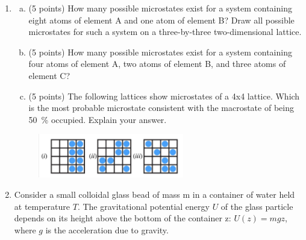 
\DeclareSIUnit{}





\pagebreak

\begin{enumerate}
    \item 
        \begin{enumerate}[a.]
            \item (5 points) How many possible microstates exist for a system containing eight atoms of element
            A and one atom of element B? Draw all possible microstates for such a system on a three-by-three
            two-dimensional lattice.
            \item (5 points) How many possible microstates exist for a system containing four atoms of element A,
            two atoms of element B, and three atoms of element C?
        \item (5 points) The following lattices show microstates of a 4x4 lattice. Which is the most probable
            microstate consistent with the macrostate of being \SI{50}{\percent} occupied. Explain your answer.
        \end{enumerate}

    \begin{figure}[h]
        \centering
        \includegraphics[width=0.6\textwidth]{./assets/fig_1.png}
    \end{figure}

    \pagebreak

    \item Consider a small colloidal glass bead of mass m in a container of water held at temperature $T$. The
    gravitational potential energy $U$ of the glass particle depends on its height above the bottom of the
    container z: $U(z) = mgz$, where $g$ is the acceleration due to gravity.


\end{enumerate}
